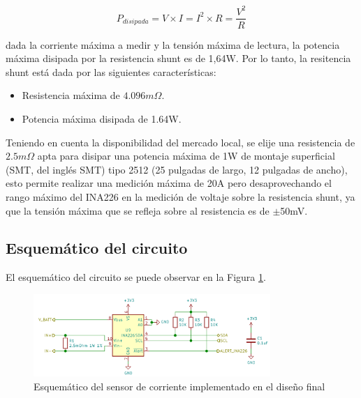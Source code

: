\documentclass[10pt, a4paper]{report}
\begin{document}
\begin{equation}
    P_{disipada} = V \times I = I^2 \times R = \frac{V^2}{R} \label{calc_pot_res}
\end{equation}

dada la corriente m\'axima a medir y la tensi\'on m\'axima de lectura, la
potencia m\'axima disipada por la resistencia shunt es de 1,64W. Por lo tanto,
la resitencia shunt est\'a dada por las siguientes caracter\'isticas:

\begin{itemize}
    \item Resistencia m\'axima de $4.096m\Omega$.
    \item Potencia m\'axima disipada de 1.64W.
\end{itemize}

Teniendo en cuenta la disponibilidad del mercado local, se elije una resistencia 
de $2.5m\Omega$ apta para disipar una potencia m\'axima de 1W de montaje
superficial (\acrshort{SMT}, del ingl\'es \acrlong{SMT}) tipo 2512 
(25 pulgadas de largo, 12 pulgadas de ancho), esto permite realizar una
medici\'on m\'axima de 20A pero desaprovechando el rango m\'aximo del INA226 en
la medici\'on de voltaje sobre la resistencia shunt, ya que la tensi\'on
m\'axima que se refleja sobre al resistencia es de $\mathrm{\pm}$50mV.

\subsection{Esquem\'atico del circuito}

El esquem\'atico del circuito se puede observar en la Figura \ref{ina226_sch}.

\begin{figure}[h!]
    \begin{center}
        \includegraphics[width=0.8\textwidth]{ina226_sch.png}
        \caption{Esquem\'atico del sensor de corriente implementado en el diseño
                 final}
        \label{ina226_sch}
    \end{center}
\end{figure}
\end{document}
